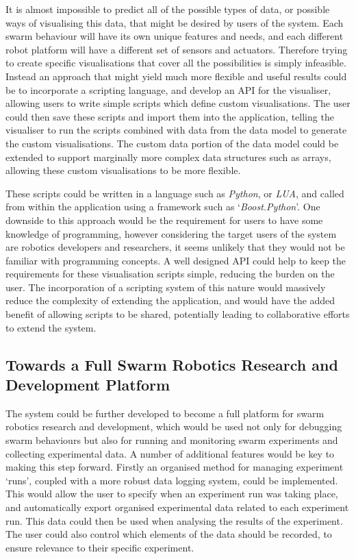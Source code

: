 It is almost impossible to predict all of the possible types of data, or possible ways of visualising this data, that might be desired by users of the system. Each swarm behaviour will have its own unique features and needs, and each different robot platform will have a different set of sensors and actuators. Therefore trying to create specific visualisations that cover all the possibilities is simply infeasible. Instead an approach that might yield much more flexible and useful results could be to incorporate a scripting language, and develop an API for the visualiser, allowing users to write simple scripts which define custom visualisations. The user could then save these scripts and import them into the application, telling the visualiser to run the scripts combined with data from the data model to generate the custom visualisations. The custom data portion of the data model could be extended to support marginally more complex data structures such as arrays, allowing these custom visualisations to be more flexible.

These scripts could be written in a language such as \textit{Python}, or \textit{LUA}, and called from within the application using a framework such as `\textit{Boost.Python}'. One downside to this approach would be the requirement for users to have some knowledge of programming, however considering the target users of the system are robotics developers and researchers, it seems unlikely that they would not be familiar with programming concepts. A well designed API could help to keep the requirements for these visualisation scripts simple, reducing the burden on the user. The incorporation of a scripting system of this nature would massively reduce the complexity of extending the application, and would have the added benefit of allowing scripts to be shared, potentially leading to collaborative efforts to extend the system.


\subsection{Towards a Full Swarm Robotics Research and Development Platform}

The system could be further developed to become a full platform for swarm robotics research and development, which would be used not only for debugging swarm behaviours but also for running and monitoring swarm experiments and collecting experimental data. A number of additional features would be key to making this step forward. Firstly an organised method for managing experiment `runs', coupled with a more robust data logging system, could be implemented. This would allow the user to specify when an experiment run was taking place, and automatically export organised experimental data related to each experiment run. This data could then be used when analysing the results of the experiment. The user could also control which elements of the data should be recorded, to ensure relevance to their specific experiment.

